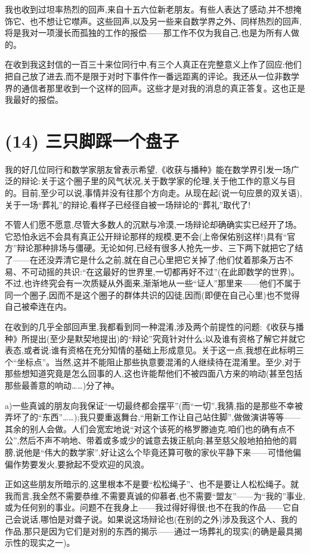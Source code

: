 我也收到过坦率热烈的回声,来自十五六位新老朋友。有些人表达了感动,并不想掩饰它、也不想让它噤声。这些回声,以及另一些来自数学界之外、同样热烈的回声,将是我对一项漫长而孤独的工作的报偿——那工作不仅为我自己,也是为所有人做的。

在收到我这封信的一百三十来位同行中,有三个人真正在完整意义上作了回应:他们把自己放了进去,而不是限于对时下事件作一番远距离的评论。我还从一位非数学界的通信者那里收到一个这样的回声。这些才是对我的消息的真正答复。这也正是我最好的报偿。

\section{(14) 三只脚踩一个盘子}

我的好几位同行和数学家朋友曾表示希望,《收获与播种》能在数学界引发一场广泛的辩论:关于这个圈子里的风气状况,关于数学家的伦理,关于他工作的意义与目的。目前,至少可以说,事情并没有往那个方向走。从现在起(说一句应景的双关语),关于一场“葬礼”的辩论,看样子已经径自被一场辩论的“葬礼”取代了!

不管人们愿不愿意,尽管大多数人的沉默与冷漠,一场辩论却确确实实已经开了场。它恐怕永远不会具有真正公开辩论那样的规模,更不会(上帝保佑别这样!)具有“官方”辩论那种排场与僵硬。无论如何,已经有很多人抢先一步、三下两下就把它了结了——在还没弄清它是什么之前,就在自己心里把它关掉了;他们仗着那条万古不易、不可动摇的共识:“在这最好的世界里,一切都再好不过”(在此即数学的世界)。不过,也许终究会有一次质疑从外面来,渐渐地从一些“证人”那里来——他们不属于同一个圈子,因而不是这个圈子的群体共识的囚徒,因而(即便在自己心里)也不觉得自己被牵连在内。

在收到的几乎全部回声里,我都看到同一种混淆,涉及两个前提性的问题:《收获与播种》所提出(至少是默契地提出)的“辩论”究竟针对什么;以及谁有资格了解它并就它表态,或者说:谁有资格在充分知情的基础上形成意见。关于这一点,我想在此标明三个“坐标点”。当然,这并不能阻止那些执意要混淆的人继续待在混淆里。至少,对于那些想知道究竟是怎么回事的人,这也许能帮他们不被四面八方来的响动(甚至包括那些最善意的响动……)分了神。

a)一些真诚的朋友向我保证“一切最终都会摆平”(而“一切”,我猜,指的是那些不幸被弄坏了的“东西”……);我只要重返舞台,“用新工作让自己站住脚”,做做演讲等等——其余的别人会做。人们会宽宏地说“对这个该死的格罗滕迪克,咱们也的确有点不公”,然后不声不响地、带着或多或少的诚意去拨正航向;甚至慈父般地拍拍他的肩膀,说他是“伟大的数学家”,好让这么个毕竟还算可敬的家伙平静下来——可惜他偏偏作势要发火,要掀起不受欢迎的风浪。

正如这些朋友所暗示的,这里根本不是要“松松绳子”、也不是要让人松松绳子。就我而言,我全然不需要恭维,不需要真诚的仰慕者,也不需要“盟友”——为“我的”事业,或为任何别的事业。问题不在我身上——我过得好得很;也不在我的作品——它自己会说话,哪怕是对聋子说。如果说这场辩论也(在别的之外)涉及我这个人、我的作品,那只是因为它们是对别的东西的揭示——通过一场葬礼的现实(的确是最具揭示性的现实之一)。

